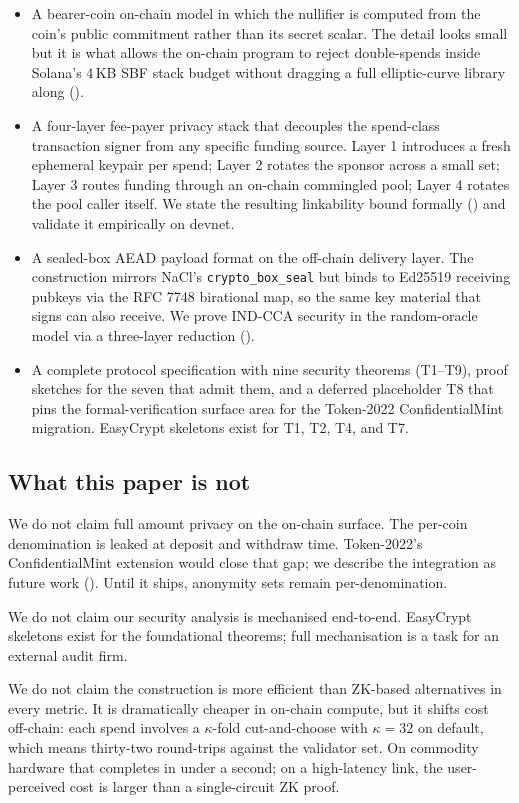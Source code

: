 \begin{itemize}[leftmargin=2em,itemsep=2pt]
  \item A bearer-coin on-chain model in which the nullifier is computed from the coin's public commitment rather than its secret scalar. The detail looks small but it is what allows the on-chain program to reject double-spends inside Solana's 4\,KB SBF stack budget without dragging a full elliptic-curve library along ().
  \item A four-layer fee-payer privacy stack that decouples the spend-class transaction signer from any specific funding source. Layer 1 introduces a fresh ephemeral keypair per spend; Layer 2 rotates the sponsor across a small set; Layer 3 routes funding through an on-chain commingled pool; Layer 4 rotates the pool caller itself. We state the resulting linkability bound formally () and validate it empirically on devnet.
  \item A sealed-box AEAD payload format on the off-chain delivery layer. The construction mirrors NaCl's \texttt{crypto\_box\_seal} but binds to Ed25519 receiving pubkeys via the RFC 7748 birational map, so the same key material that signs can also receive. We prove IND-CCA security in the random-oracle model via a three-layer reduction ().
  \item A complete protocol specification with nine security theorems (T1--T9), proof sketches for the seven that admit them, and a deferred placeholder T8 that pins the formal-verification surface area for the Token-2022 ConfidentialMint migration. EasyCrypt skeletons exist for T1, T2, T4, and T7.
\end{itemize}

\subsection{What this paper is not}

We do not claim full amount privacy on the on-chain surface. The per-coin denomination is leaked at deposit and withdraw time. Token-2022's ConfidentialMint extension would close that gap; we describe the integration as future work (). Until it ships, anonymity sets remain per-denomination.

We do not claim our security analysis is mechanised end-to-end. EasyCrypt skeletons exist for the foundational theorems; full mechanisation is a task for an external audit firm.

We do not claim the construction is more efficient than ZK-based alternatives in every metric. It is dramatically cheaper in on-chain compute, but it shifts cost off-chain: each spend involves a $\kappa$-fold cut-and-choose with $\kappa = 32$ on default, which means thirty-two round-trips against the validator set. On commodity hardware that completes in under a second; on a high-latency link, the user-perceived cost is larger than a single-circuit ZK proof.

